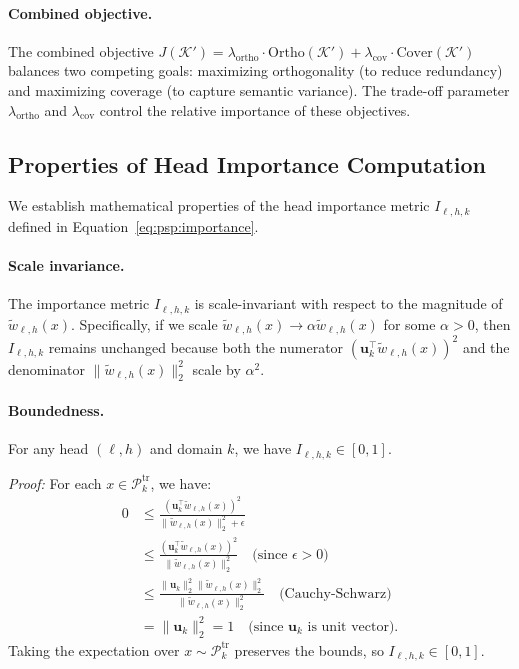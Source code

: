 \paragraph{Combined objective.}
The combined objective $J(\mathcal{K}') = \lambda_{\mathrm{ortho}} \cdot \mathrm{Ortho}(\mathcal{K}') + \lambda_{\mathrm{cov}} \cdot \mathrm{Cover}(\mathcal{K}')$ balances two competing goals: maximizing orthogonality (to reduce redundancy) and maximizing coverage (to capture semantic variance).
The trade-off parameter $\lambda_{\mathrm{ortho}}$ and $\lambda_{\mathrm{cov}}$ control the relative importance of these objectives.

\subsection{Properties of Head Importance Computation}
\label{app:math_importance}

We establish mathematical properties of the head importance metric $I_{\ell,h,k}$ defined in Equation~\eqref{eq:psp:importance}.

\paragraph{Scale invariance.}
The importance metric $I_{\ell,h,k}$ is scale-invariant with respect to the magnitude of $\tilde{w}_{\ell,h}(x)$.
Specifically, if we scale $\tilde{w}_{\ell,h}(x) \rightarrow \alpha \tilde{w}_{\ell,h}(x)$ for some $\alpha > 0$, then $I_{\ell,h,k}$ remains unchanged because both the numerator $(\mathbf{u}_k^\top \tilde{w}_{\ell,h}(x))^2$ and the denominator $\|\tilde{w}_{\ell,h}(x)\|_2^2$ scale by $\alpha^2$.

\paragraph{Boundedness.}
For any head $(\ell,h)$ and domain $k$, we have $I_{\ell,h,k} \in [0, 1]$.

\emph{Proof:} For each $x \in \mathcal{P}_k^{\mathrm{tr}}$, we have:
\begin{align}
0 &\leq \frac{(\mathbf{u}_k^\top \tilde{w}_{\ell,h}(x))^2}{\|\tilde{w}_{\ell,h}(x)\|_2^2 + \epsilon} \\
&\leq \frac{(\mathbf{u}_k^\top \tilde{w}_{\ell,h}(x))^2}{\|\tilde{w}_{\ell,h}(x)\|_2^2} \quad \text{(since $\epsilon > 0$)} \\
&\leq \frac{\|\mathbf{u}_k\|_2^2 \|\tilde{w}_{\ell,h}(x)\|_2^2}{\|\tilde{w}_{\ell,h}(x)\|_2^2} \quad \text{(Cauchy-Schwarz)} \\
&= \|\mathbf{u}_k\|_2^2 = 1 \quad \text{(since $\mathbf{u}_k$ is unit vector)}.
\end{align}
Taking the expectation over $x \sim \mathcal{P}_k^{\mathrm{tr}}$ preserves the bounds, so $I_{\ell,h,k} \in [0, 1]$.

